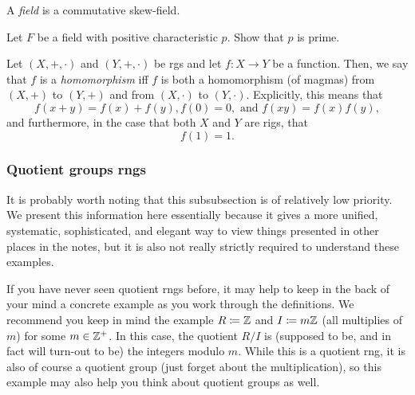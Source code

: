 \begin{dfn}[Field]
A \emph{field} is a commutative skew-field.
\end{dfn}
\begin{exr}
Let $F$ be a field with positive characteristic $p$.  Show that $p$ is prime.
\end{exr}
\begin{dfn}
Let $(X,+,\cdot )$ and $(Y,+,\cdot )$ be rgs and let $f:X\rightarrow Y$ be a function.  Then, we say that $f$ is a \emph{homomorphism} iff $f$ is both a homomorphism (of magmas) from $(X,+)$ to $(Y,+)$ and from $(X,\cdot )$ to $(Y,\cdot )$.  Explicitly, this means that
\begin{equation}
f(x+y)=f(x)+f(y),f(0)=0,\text{ and }f(xy)=f(x)f(y),
\end{equation}
and furthermore, in the case that both $X$ and $Y$ are rigs, that
\begin{equation}
f(1)=1.
\end{equation}
\end{dfn}

\subsubsection{Quotient groups rngs}

It is probably worth noting that this subsubsection is of relatively low priority.  We present this information here essentially because it gives a more unified, systematic, sophisticated, and elegant way to view things presented in other places in the notes, but it is also not really strictly required to understand these examples.

If you have never seen quotient rngs before, it may help to keep in the back of your mind a concrete example as you work through the definitions.  We recommend you keep in mind the example $R\coloneqq \mathbb{Z}$ and $I\coloneqq m\mathbb{Z}$ (all multiplies of $m$) for some $m\in \mathbb{Z} ^+$.  In this case, the quotient $R/I$ is (supposed to be, and in fact will turn-out to be) the integers modulo $m$.  While this is a quotient rng, it is also of course a quotient group (just forget about the multiplication), so this example may also help you think about quotient groups as well.

